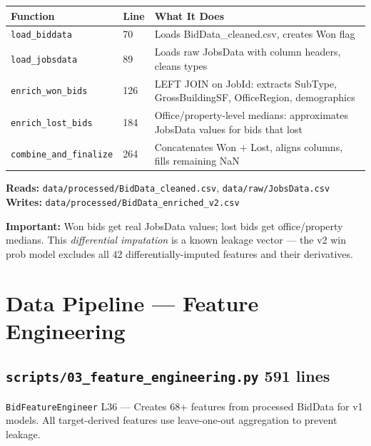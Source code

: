 \documentclass[11pt,a4paper]{article}
\newcommand{\file}[1]{\texttt{\color{gssblue!70!black}#1}}
\newcommand{\func}[1]{\texttt{\color{gssgreen!80!black}#1}}
\newcommand{\cls}[1]{\texttt{\color{uipurple}#1}}
\newcommand{\lineref}[1]{\textcolor{gssgray}{\small L#1}}
\newcommand{\pipetag}[1]{\colorbox{pipeblue!15}{\small\textcolor{pipeblue}{\textbf{#1}}}}
\begin{document}
\begin{longtable}{l l p{8cm}}
\toprule
\textbf{Function} & \textbf{Line} & \textbf{What It Does} \\
\midrule
\endhead
\func{load\_biddata} & 70 & Loads BidData\_cleaned.csv, creates Won flag \\
\func{load\_jobsdata} & 89 & Loads raw JobsData with column headers, cleans types \\
\func{enrich\_won\_bids} & 126 & LEFT JOIN on JobId: extracts SubType, GrossBuildingSF, OfficeRegion, demographics \\
\func{enrich\_lost\_bids} & 184 & Office/property-level medians: approximates JobsData values for bids that lost \\
\func{combine\_and\_finalize} & 264 & Concatenates Won + Lost, aligns columns, fills remaining NaN \\
\bottomrule
\end{longtable}

\textbf{Reads:} \file{data/processed/BidData\_cleaned.csv}, \file{data/raw/JobsData.csv}\\
\textbf{Writes:} \file{data/processed/BidData\_enriched\_v2.csv}

\textbf{Important:} Won bids get real JobsData values; lost bids get office/property
medians. This \emph{differential imputation} is a known leakage vector --- the v2 win
prob model excludes all 42 differentially-imputed features and their derivatives.

\section{Data Pipeline --- Feature Engineering}
\label{sec:feature-eng}

\subsection{\file{scripts/03\_feature\_engineering.py} \pipetag{591 lines}}

\cls{BidFeatureEngineer} \lineref{36} --- Creates 68+ features from processed BidData
for v1 models. All target-derived features use leave-one-out aggregation to prevent
leakage.
\end{document}
